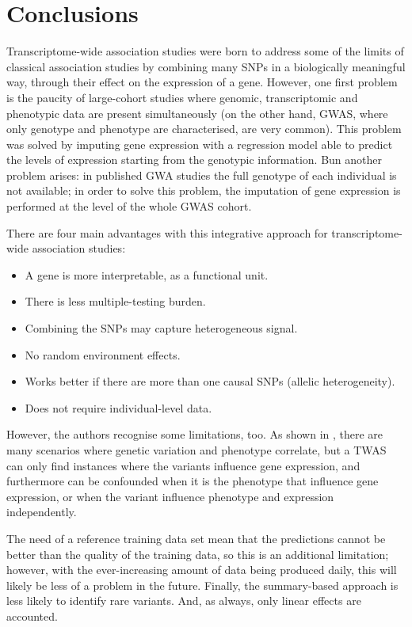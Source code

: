 \documentclass[../main.tex]{subfiles}
\begin{document}
\section{Conclusions}

Transcriptome-wide association studies were born to address some of the 
limits of classical association studies by combining many SNPs in a 
biologically meaningful way, \ie through their effect on the expression 
of a gene. However, one first problem is the paucity of large-cohort 
studies where genomic, transcriptomic and phenotypic data are present 
simultaneously (on the other hand, GWAS, where only genotype and 
phenotype are characterised, are very common). This problem was solved 
by imputing gene expression with a regression model able to predict the 
levels of expression starting from the genotypic information. Bun 
another problem arises: in published GWA studies the full genotype of 
each individual is not available; in order to solve this problem, the 
imputation of gene expression is performed at the level of the whole 
GWAS cohort.

There are four main advantages with this integrative approach for 
transcriptome-wide association studies:

\begin{itemize}
	\item A gene is more interpretable, as a functional unit.
	\item There is less multiple-testing burden.
	\item Combining the SNPs may capture heterogeneous signal.
	\item No random environment effects.
	\item Works better if there are more than one causal SNPs (allelic 
heterogeneity).
	\item Does not require individual-level data.
\end{itemize}

However, the authors recognise some limitations, too. As shown in 
, there are many scenarios where genetic variation 
and phenotype correlate, but a TWAS can only find instances where the 
variants influence gene expression, and furthermore can be confounded 
when it is the phenotype that influence gene expression, or when the 
variant influence phenotype and expression independently.

The need of a reference training data set mean that the predictions 
cannot be better than the quality of the training data, so this is an 
additional limitation; however, with the ever-increasing amount of data 
being produced daily, this will likely be less of a problem in the 
future. Finally, the summary-based approach is less likely to identify 
rare variants. And, as always, only linear effects are 
accounted.
\end{document}
